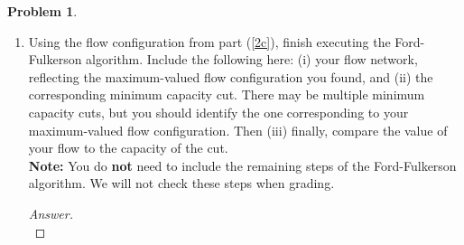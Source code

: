 \documentclass[11pt]{article}
\theoremstyle{definition}
\theoremstyle{definition}
\newtheorem{required}{Problem}
\theoremstyle{definition}
\begin{document}
\begin{required}
\begin{enumerate}[label=(\alph*)]
\begin{proof}[Answer]
\begin{center}
\end{center}
\end{proof}



\newpage
\subsection{Problem 2\ref{2d}}
\item \label{2d} Using the flow configuration from part (\ref{2c}), finish executing the Ford-Fulkerson algorithm. Include the following here: (i) your flow network, reflecting the maximum-valued flow configuration you found, and (ii) the corresponding minimum capacity cut. There may be multiple minimum capacity cuts, but you should identify the one corresponding to your maximum-valued flow configuration. Then (iii) finally, compare the value of your flow to the capacity of the cut. \\

\noindent \textbf{Note:} You do \textbf{not} need to include the remaining steps of the Ford-Fulkerson algorithm. We will not check these steps when grading.
\begin{proof}[Answer] $ $ \\





\end{proof}
\end{enumerate}
\end{required}
\end{document}
